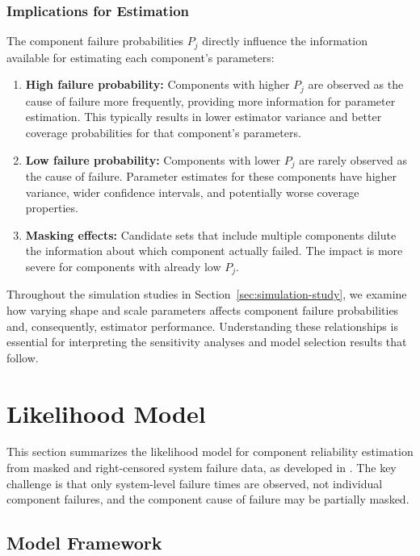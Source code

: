 \documentclass[11pt]{article}
\begin{document}
\subsubsection*{Implications for Estimation}

The component failure probabilities $P_j$ directly influence the information available for estimating each component's parameters:

\begin{enumerate}
\item \textbf{High failure probability:} Components with higher $P_j$ are observed as the cause of failure more frequently, providing more information for parameter estimation. This typically results in lower estimator variance and better coverage probabilities for that component's parameters.

\item \textbf{Low failure probability:} Components with lower $P_j$ are rarely observed as the cause of failure. Parameter estimates for these components have higher variance, wider confidence intervals, and potentially worse coverage properties.

\item \textbf{Masking effects:} Candidate sets that include multiple components dilute the information about which component actually failed. The impact is more severe for components with already low $P_j$.
\end{enumerate}

Throughout the simulation studies in Section~\ref{sec:simulation-study}, we examine how varying shape and scale parameters affects component failure probabilities and, consequently, estimator performance. Understanding these relationships is essential for interpreting the sensitivity analyses and model selection results that follow.

\section{Likelihood Model}

This section summarizes the likelihood model for component reliability estimation from masked and right-censored system failure data, as developed in \cite{towell2023reliability}. The key challenge is that only system-level failure times are observed, not individual component failures, and the component cause of failure may be partially masked.

\subsection{Model Framework}
\end{document}
